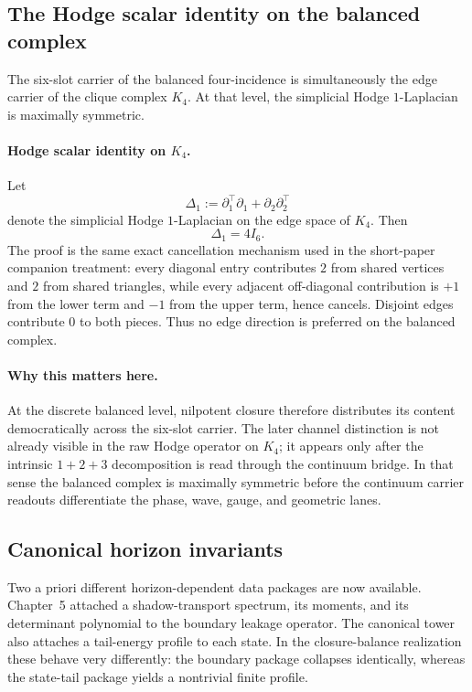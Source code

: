 
\subsection{The Hodge scalar identity on the balanced complex}
\label{subsec:hodge-scalar-theorem}

The six-slot carrier of the balanced four-incidence is simultaneously the edge
carrier of the clique complex \(K_4\). At that level, the simplicial Hodge
\(1\)-Laplacian is maximally symmetric.

\paragraph{Hodge scalar identity on \(K_4\).}
Let
\[
\Delta_1:=\partial_1^\top\partial_1+\partial_2\partial_2^\top
\]
denote the simplicial Hodge \(1\)-Laplacian on the edge space of \(K_4\).
Then
\[
\Delta_1 = 4 I_6.
\]
The proof is the same exact cancellation mechanism used in the short-paper
companion treatment:
every diagonal entry contributes \(2\) from shared vertices and \(2\) from
shared triangles, while every adjacent off-diagonal contribution is
\(+1\) from the lower term and \(-1\) from the upper term, hence cancels.
Disjoint edges contribute \(0\) to both pieces. Thus no edge direction is
preferred on the balanced complex.

\paragraph{Why this matters here.}
At the discrete balanced level, nilpotent closure therefore distributes its
content democratically across the six-slot carrier. The later channel
distinction is not already visible in the raw Hodge operator on \(K_4\); it
appears only after the intrinsic \(1+2+3\) decomposition is read through the
continuum bridge. In that sense the balanced complex is maximally symmetric
before the continuum carrier readouts differentiate the phase, wave, gauge,
and geometric lanes.

\subsection{Canonical horizon invariants}

Two a priori different horizon-dependent data packages are now available.
Chapter~5 attached a shadow-transport spectrum, its moments, and its
determinant polynomial to the boundary leakage operator. The canonical tower
also attaches a tail-energy profile to each state. In the closure-balance
realization these behave very differently: the boundary package collapses
identically, whereas the state-tail package yields a nontrivial finite profile.


